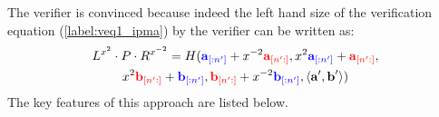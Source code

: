 \vspace{1cm}
The verifier is convinced because indeed the left hand size of the verification equation (\ref{label:veq1_ipma}) by the verifier can be written as:
\begin{multline*}
    L^{x^2}\cdot P \cdot R^{x^{-2}} = H(\textcolor{blue}{\textbf{a}_{[:n^{\prime}]}} 
    + x^{-2}
    \textcolor{red}{\textbf{a}_{[n^{\prime}:]}},
    x^2\textcolor{blue}{\textbf{a}_{[:n^{\prime}]}} 
    +
    \textcolor{red}{\textbf{a}_{[n^{\prime}:]}},\\
    x^2\textcolor{red}{\textbf{b}_{[n^{\prime}:]}} 
    +
    \textcolor{blue}{\textbf{b}_{[:n^{\prime}]}},
    \textcolor{red}{\textbf{b}_{[n^{\prime}:]}} 
    + x^{-2}
    \textcolor{blue}{\textbf{b}_{[:n^{\prime}]}},
    \langle \textbf{a}^{\prime},\textbf{b}^{\prime} \rangle
    )
\end{multline*}
The key features of this approach are listed below.
